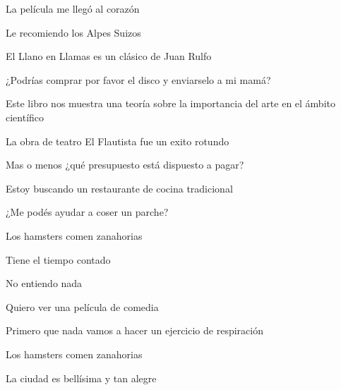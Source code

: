 La película me llegó al corazón

Le recomiendo los Alpes Suizos

El Llano en Llamas es un clásico de Juan Rulfo

¿Podrías comprar por favor el disco y enviarselo a mi mamá?

Este libro nos muestra una teoría sobre la importancia del arte en el ámbito científico

La obra de teatro El Flautista fue un exito rotundo

Mas o menos ¿qué presupuesto está dispuesto a pagar?

Estoy buscando un restaurante de cocina tradicional

¿Me podés ayudar a coser un parche?

Los hamsters comen zanahorias

Tiene el tiempo contado

No entiendo nada

Quiero ver una película de comedia

Primero que nada vamos a hacer un ejercicio de respiración

Los hamsters comen zanahorias

La ciudad es bellísima y tan alegre


\onecolumn